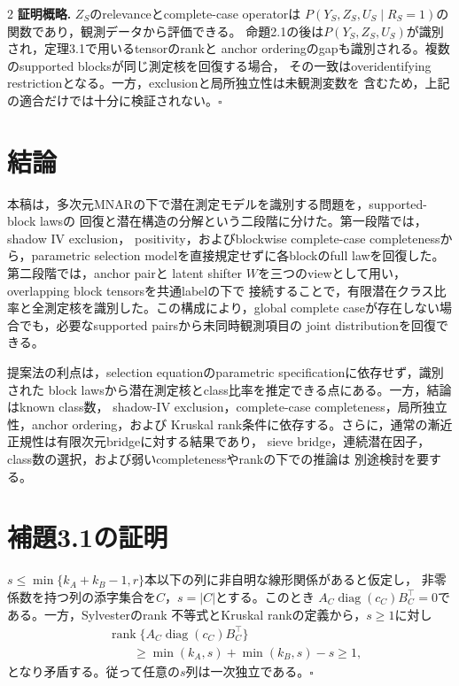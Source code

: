 \documentclass[a4paper,10pt]{article}
\begin{document}
\begin{multicols}{2}
\noindent\textbf{証明概略.}
$Z_S$のrelevanceとcomplete-case operatorは
$P(Y_S,Z_S,U_S\mid R_S=1)$の関数であり，観測データから評価できる。
命題2.1の後は$P(Y_S,Z_S,U_S)$が識別され，定理3.1で用いるtensorのrankと
anchor orderingのgapも識別される。複数のsupported blocksが同じ測定核を回復する場合，
その一致はoveridentifying restrictionとなる。一方，exclusionと局所独立性は未観測変数を
含むため，上記の適合だけでは十分に検証されない。\hfill$\square$

\section{結論}
本稿は，多次元MNARの下で潜在測定モデルを識別する問題を，supported-block lawsの
回復と潜在構造の分解という二段階に分けた。第一段階では，shadow IV exclusion，
positivity，およびblockwise complete-case completenessから，parametric selection
modelを直接規定せずに各blockのfull lawを回復した。第二段階では，anchor pairと
latent shifter $W$を三つのviewとして用い，overlapping block tensorsを共通labelの下で
接続することで，有限潜在クラス比率と全測定核を識別した。この構成により，global
complete caseが存在しない場合でも，必要なsupported pairsから未同時観測項目の
joint distributionを回復できる。

提案法の利点は，selection equationのparametric specificationに依存せず，識別された
block lawsから潜在測定核とclass比率を推定できる点にある。一方，結論はknown class数，
shadow-IV exclusion，complete-case completeness，局所独立性，anchor ordering，および
Kruskal rank条件に依存する。さらに，通常の漸近正規性は有限次元bridgeに対する結果であり，
sieve bridge，連続潜在因子，class数の選択，および弱いcompletenessやrankの下での推論は
別途検討を要する。

\appendix
\section{補題3.1の証明}
$s\le\min\{k_A+k_B-1,r\}$本以下の列に非自明な線形関係があると仮定し，
非零係数を持つ列の添字集合を$C$，$s=|C|$とする。このとき
$A_C\operatorname{diag}(c_C)B_C^\top=0$である。一方，Sylvesterのrank
不等式とKruskal rankの定義から，$s\ge1$に対し
\begin{equation}
\begin{aligned}
&\operatorname{rank}\{A_C\operatorname{diag}(c_C)B_C^\top\}\\
&\qquad\ge\min(k_A,s)+\min(k_B,s)-s\ge1,
\end{aligned}
\label{eq:sylvester-rank-bound}
\end{equation}
となり矛盾する。従って任意の$s$列は一次独立である。\hfill$\square$


\end{multicols}
\end{document}
